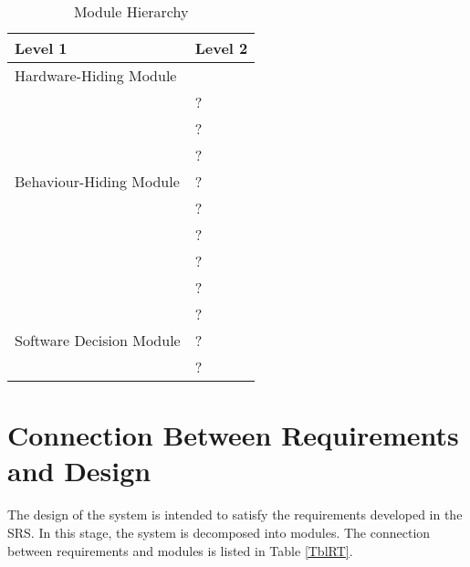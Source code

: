 \documentclass[12pt, titlepage]{article}
\begin{document}
\begin{table}[h!]
  \centering
  \begin{tabular}{p{} p{}}
    \toprule
    \textbf{Level 1}                                      & \textbf{Level 2} \\
    \midrule

    {Hardware-Hiding Module}                              & ~                \\
    \midrule

    \multirow{7}{0.3\textwidth}{Behaviour-Hiding Module}  & ?                \\
                                                          & ?                \\
                                                          & ?                \\
                                                          & ?                \\
                                                          & ?                \\
                                                          & ?                \\
                                                          & ?                \\
                                                          & ?                \\
    \midrule

    \multirow{3}{0.3\textwidth}{Software Decision Module} & {?}              \\
                                                          & ?                \\
                                                          & ?                \\
    \bottomrule

  \end{tabular}
  \caption{Module Hierarchy}
  \label{TblMH}
\end{table}

\section{Connection Between Requirements and Design} \label{SecConnection}

The design of the system is intended to satisfy the requirements developed in the SRS. In this
stage, the system is decomposed into modules. The connection between requirements and modules is
listed in Table \ref{TblRT}.
\end{document}
